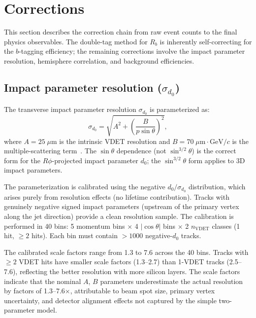 \documentclass[11pt,a4paper]{article}
\begin{document}
\section{Corrections}
\label{sec:corrections}

This section describes the correction chain from raw event counts to the final
physics observables. The double-tag method for $R_b$ is inherently self-correcting
for the $b$-tagging efficiency; the remaining corrections involve the impact parameter
resolution, hemisphere correlation, and background efficiencies.

\subsection{Impact parameter resolution ($\sigma_{d_0}$)}
\label{sec:sigma_d0}

The transverse impact parameter resolution $\sigma_{d_0}$ is parameterized as:
\begin{equation}
\sigma_{d_0} = \sqrt{A^2 + \left(\frac{B}{p \sin\theta}\right)^2},
\label{eq:sigma_d0}
\end{equation}
where $A = 25\;\mu\mathrm{m}$ is the intrinsic VDET resolution and
$B = 70\;\mu\mathrm{m}\cdot\mathrm{GeV}/c$ is the multiple-scattering
term~\cite{ALEPH:VDET}. The $\sin\theta$ dependence (not $\sin^{3/2}\theta$)
is the correct form for the $R\phi$-projected impact parameter $d_0$; the
$\sin^{3/2}\theta$ form applies to 3D impact parameters.

The parameterization is calibrated using the negative $d_0/\sigma_{d_0}$ distribution,
which arises purely from resolution effects (no lifetime contribution). Tracks with
genuinely negative signed impact parameters (upstream of the primary vertex along the
jet direction) provide a clean resolution sample. The calibration is performed in
40 bins: 5 momentum bins $\times$ 4 $|\cos\theta|$ bins $\times$ 2 $n_\mathrm{VDET}$
classes (1 hit, $\geq 2$ hits). Each bin must contain $> 1000$ negative-$d_0$ tracks.

The calibrated scale factors range from 1.3 to 7.6 across the 40 bins. Tracks with
$\geq 2$ VDET hits have smaller scale factors (1.3--2.7) than 1-VDET tracks (2.5--7.6),
reflecting the better resolution with more silicon layers. The scale factors indicate
that the nominal $A$, $B$ parameters underestimate the actual resolution by factors
of 1.3--7.6$\times$, attributable to beam spot size, primary vertex uncertainty, and
detector alignment effects not captured by the simple two-parameter model.
\end{document}
